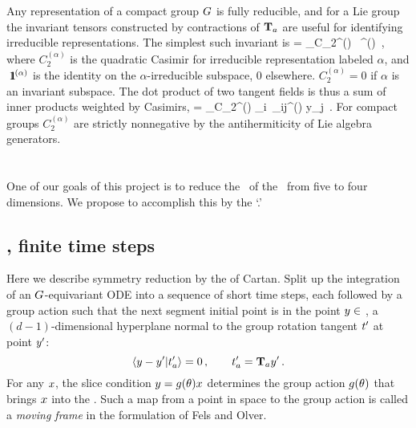 {Any representation of a compact group $G$ is fully
reducible, and for a Lie group
the invariant tensors constructed by contractions
of $\mathbf{T}_a$ are useful for identifying irreducible
representations. The simplest such invariant is
\beq
\dual{\Lg} \cdot \Lg = \sum_\alpha C_2^{(\alpha)} \, \id^{(\alpha)}
\,,
where $C_2^{(\alpha)}$ is the quadratic Casimir for
irreducible representation labeled $\alpha$, and
$\id^{(\alpha)}$ is the identity on the $\alpha$-irreducible
subspace, 0 elsewhere. $ C_2^{(\alpha)} =0$ if $\alpha$
is an invariant subspace.
The dot product of two tangent fields
 is thus a sum of inner products
weighted by Casimirs,
\beq
{}
   = \sum_\alpha C_2^{(\alpha)} _i\, \delta_{ij}^{(\alpha)} y_j
\,.
For compact groups $C_2^{(\alpha)}$ are strictly nonnegative by
the antihermiticity  of Lie algebra generators.



\section{\Reducedsp}
\label{sect:reducedStateSp}

One of our goals of this project is to reduce the \statesp\ of the \cLe\ from five to four dimensions. We propose to accomplish this by the `{\mslices}.'

\subsection{\Mslices, finite time steps}
\label{sect:MovFrame}


Here we describe symmetry reduction by the
{\em {\mslices}} of
Cartan.
Split up the integration of an $\Group$-equivariant ODE into
a sequence of short time steps, each followed by a group action
such that the next segment initial point is in the point
$\sspRed \in$ {\slice}, a $(d\!-\!1)$-dimensional hyperplane
normal to the group rotation tangent $\sliceTan{}$ at point
$\slicep$:
\[ %
\dotProd{\sspRed - \slicep}{\sliceTan{a}}=0
    \,,\qquad
\sliceTan{a} = \Lg_a \slicep
\,.
\] %
For any $x$, the slice condition $y =
g({\bf \theta})x$ determines the group
action $g({\bf \theta})$ that brings $ x$ into the \slice.
Such a map from a point in space to the group action is called a
\emph{moving frame} in the formulation of Fels and
Olver.

}
